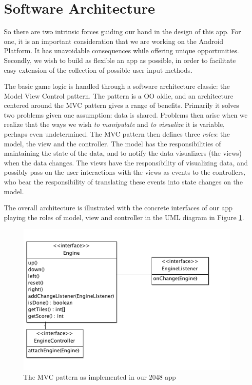 \documentclass[a4paper, 12pt]{article}
\begin{document}
\section{Software Architecture}

So there are two intrinsic forces guiding our hand in the design of
this app. For one, it is an important consideration that we are
working on the Android Platform. It has unavoidable consequences while
offering unique opportunities. Secondly, we wish to build as flexible
an app as possible, in order to facilitate easy extension of the
collection of possible user input methods.

The basic game logic is handled through a software architecture
classic: the Model View Control pattern. The pattern is a OO oldie,
and an architecture centered around the MVC pattern gives a range of
benefits. Primarily it solves two problems given one assumption: data
is shared. Problems then arise when we realize that the ways we wish
\emph{to manipulate} and \emph{to visualize} it is variable, perhaps
even undetermined. The MVC pattern then defines three \emph{roles}:
the model, the view and the controller. The model has the
responsibilities of maintaining the state of the data, and to notify
the data visualizers (the views) when the data changes. The views have
the responsibility of visualizing data, and possibly pass on the user
interactions with the views as events to the controllers, who bear the
responsibility of translating these events into state changes on the
model.

The overall architecture is illustrated with the concrete interfaces
of our app playing the roles of model, view and controller in the UML
diagram in Figure \ref{fig:mvc-1.png}.

\begin{figure}[!h]
  \includegraphics[width=\linewidth]{mvc-1.png}
  \caption{The MVC pattern as implemented in our 2048 app}
  \label{fig:mvc-1.png}
\end{figure}
\end{document}
